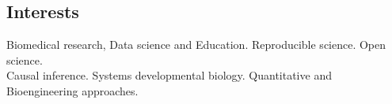 \documentclass[margin,line]{res}
\begin{document}
\begin{resume}

\vspace*{.15in}

\section{\sc Interests}%

Biomedical research, Data science and Education. Reproducible science. Open science. \\
Causal inference. Systems developmental biology. Quantitative and Bioengineering approaches.  






\end{resume}
\end{document}
